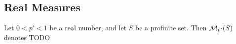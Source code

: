 \subsection{Real Measures}

\begin{definition}
  \label{real-measures}
  Let $0 < p' < 1$ be a real number, and let $S$ be a profinite set.
  Then $\mathcal M_{p'}(S)$ denotes TODO
\end{definition}
